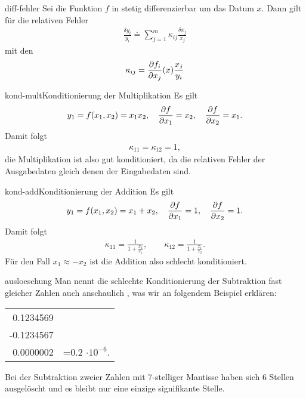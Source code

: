 \begin{Lemma}{diff-fehler}
  Sei die Funktion $f$ in  stetig
  differenzierbar um das Datum $x$. Dann gilt für die relativen Fehler
  \begin{gather*}
    \frac{\delta y_i}{y_i}
    \doteq \sum_{j=1}^m \kappa_{ij}\frac{\delta x_j}{x_j}
  \end{gather*}
  mit den 
  \begin{gather}
    \kappa_{ij} = \frac{\partial f_i}{\partial x_j}(x)
    \frac{x_j}{y_i}
  \end{gather}
\end{Lemma}

\begin{Beispiel*}{kond-mult}{Konditionierung der Multiplikation}
  Es gilt
  \begin{gather}
    y_1 = f(x_1,x_2) = x_1 x_2,
    \quad \frac{\partial f}{\partial x_1} = x_2,
    \quad \frac{\partial f}{\partial x_2} = x_1.
  \end{gather}
  Damit folgt
  \begin{gather}
    \kappa_{11} = \kappa_{12} = 1,
  \end{gather}
  die Multiplikation ist also gut konditioniert, da die relativen
  Fehler der Ausgabedaten gleich denen der Eingabedaten sind.
\end{Beispiel*}

\begin{Beispiel*}{kond-add}{Konditionierung der Addition}
  Es gilt
  \begin{gather}
    y_1 = f(x_1,x_2) = x_1 + x_2,
    \quad \frac{\partial f}{\partial x_1} = 1,
    \quad \frac{\partial f}{\partial x_2} = 1.
  \end{gather}
  Damit folgt
  \begin{gather}
    \kappa_{11} = \frac{1}{1+\frac{x_2}{x_1}},
    \qquad\kappa_{12} = \frac{1}{1+\frac{x_1}{x_2}}.
  \end{gather}
  Für den Fall $x_1 \approx -x_2$ ist die Addition also schlecht konditioniert.
\end{Beispiel*}

\begin{Bemerkung}{ausloeschung}
  Man nennt die schlechte Konditionierung der Subtraktion fast
  gleicher Zahlen auch anschaulich , was wir an
  folgendem Beispiel erklären:
  \begin{center}
    \begin{tabular}{r@{}l}
      0.1234569&\\
      -0.1234567&\\\hline
      0.0000002&=0.2 $\cdot 10^{-6}$.
    \end{tabular}
  \end{center}
  Bei der Subtraktion zweier Zahlen mit 7-stelliger Mantisse haben
  sich 6 Stellen ausgelöscht und es bleibt nur eine einzige
  signifikante Stelle.
\end{Bemerkung}

